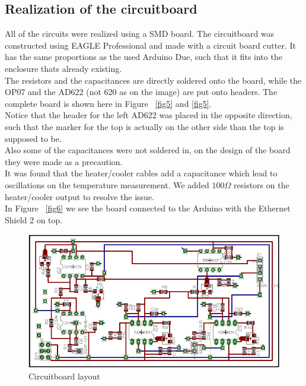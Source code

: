 \documentclass[12pt]{scrartcl}
\begin{document}
    \subsection{Realization of the circuitboard}
      All of the circuits were realized using a SMD board. The circuitboard was
      constructed using EAGLE Professional and made with a circuit board cutter.
      It has the same proportions as the used Arduino Due, such that it fits
      into the enclosure thats already existing.
      \\The resistors and the capacitances are directly soldered onto the board,
      while the OP07 and the AD622 (not 620 as on the image) are put onto
      headers. The complete board is shown here in Figure~ \ref{fig5} and \ref{fig5}.
      \\ Notice that the header for the left AD622 was placed in the opposite
      direction, such that the marker for the top is actually on the other side
      than the top is supposed to be.\\
      Also some of the capacitances were not soldered in, on the design of the
      board they were made as a precaution.\\
      It was found that the heater/cooler cables add a capacitance which lead
      to oscillations on the temperature measurement. We added $100 \Omega$
      resistors on the heater/cooler output to resolve the issue.\\ In Figure~
      \ref{fig6} we see the board connected to the Arduino with the Ethernet
      Shield 2 on top.\\
      \begin{figure}[H]
        \includegraphics[width = \textwidth]{board.png}
        \caption{Circuitboard layout}
        \label{fig4}
      \end{figure}
\end{document}
